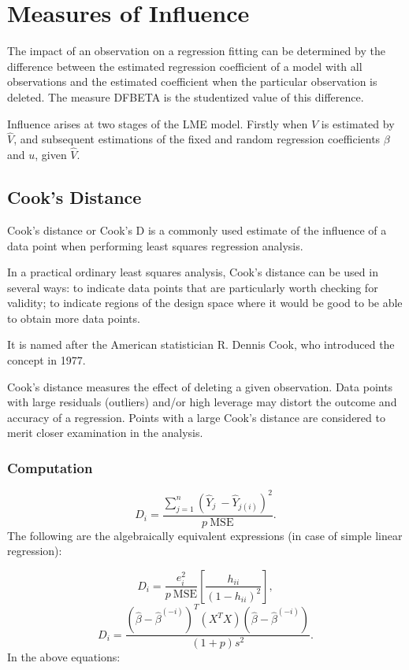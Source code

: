 \documentclass[residuals.tex]{subfiles}
\begin{document}
	
\section{Measures of Influence}
The impact of an observation on a regression fitting can be determined by the difference between the estimated regression coefficient of a model with all observations and the estimated coefficient when the particular observation is deleted. The measure DFBETA is the studentized value of this difference.

Influence arises at two stages of the LME model. Firstly when $V$ is estimated by $\hat{V}$, and subsequent
estimations of the fixed and random regression coefficients $\beta$ and $u$, given $\hat{V}$.

\subsection{Cook's Distance}
Cook's distance or Cook's D is a commonly used estimate of the influence of a data point when performing least squares regression analysis.

In a practical ordinary least squares analysis, Cook's distance can be used in several ways: to indicate data points that are particularly worth checking for validity; to indicate regions of the design space where it would be good to be able to obtain more data points. 

It is named after the American statistician R. Dennis Cook, who introduced the concept in 1977.

Cook's distance measures the effect of deleting a given observation. Data points with large residuals (outliers) and/or high leverage may distort the outcome and accuracy of a regression. Points with a large Cook's distance are considered to merit closer examination in the analysis.

\subsubsection{Computation}
\[ D_i = \frac{ \sum_{j=1}^n (\hat Y_j\ - \hat Y_{j(i)})^2 }{p \ \mathrm{MSE}} .\]
The following are the algebraically equivalent expressions (in case of simple linear regression):

\[ D_i = \frac{e_i^2}{p \ \mathrm{MSE}}\left[\frac{h_{ii}}{(1-h_{ii})^2}\right],\]
\[ D_i = \frac{ (\hat \beta - \hat {\beta}^{(-i)})^T(X^TX)(\hat \beta - \hat {\beta}^{(-i)}) } {(1+p)s^2}.\]
In the above equations:
\end{document}
